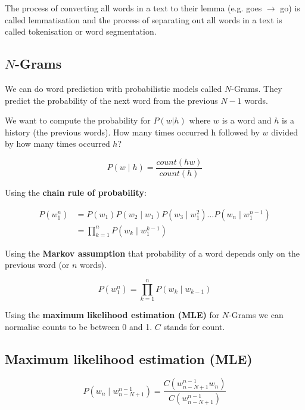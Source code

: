 The process of converting all words in a text to their lemma (e.g. goes $\to$ go) is called lemmatisation and the process of separating out all words in a text is called tokenisation or word segmentation.

\subsection*{$N$-Grams}

We can do word prediction with probabilistic models called $N$-Grams. They predict the probability of the next word from the previous $N-1$ words.

We want to compute the probability for $P(w|h)$ where $w$ is a word and $h$ is a history (the previous words). How many times occurred h followed by $w$ divided by how many times occurred $h$?

\begin{equation}
  P(w \mid h) = \frac{count(hw)}{count(h)}
  \label{eq:Probwh}
\end{equation}

Using the \textbf{chain rule of probability}:

\begin{equation}
  \begin{split}
  P(w_1^n) &= P(w_1)P(w_2 \mid w_1)P(w_3 \mid w_1^2 ) \ldots P(w_n \mid w_1^{n-1})\\
  &= \prod_{k=1}^{n}P(w_k \mid w_1^{k-1})
  \end{split}
  \label{eq:Probw1n}
\end{equation}

Using the \textbf{Markov assumption} that probability of a word depends only on the previous word (or $n$ words).

\begin{equation}
  P(w_1^n) = \prod_{k=1}^{n}P(w_k \mid w_{k-1})
  \label{eq:Probw1n2}
\end{equation}

Using the \textbf{maximum likelihood estimation (MLE)} for $N$-Grams we can normalise counts to be between 0 and 1. $C$ stands for count.

\subsection*{Maximum likelihood estimation (MLE)}

\begin{equation}
  P(w_n \mid w_{n-N+1}^{n-1}) = \frac{C(w_{n-N+1}^{n-1} w_n)}{C(w_{n-N+1}^{n-1})}
  \label{eq:Probwn}
\end{equation}

